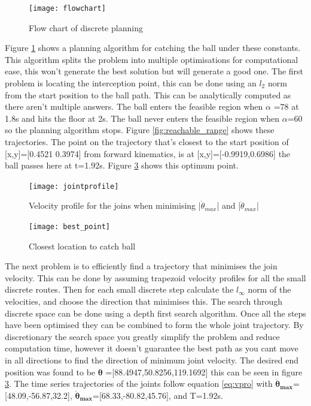 \documentclass[twoside,twocolumn]{article}
\begin{document}
\begin{figure}[h]
  \centering
    \texttt{[image: flowchart]}
  \caption{Flow chart of discrete planning}
  \label{fig:flow}
\end{figure}

Figure \ref{fig:flow} shows a planning algorithm for catching the ball under these constants. This algorithm splits the problem into multiple optimisations for computational ease, this won't generate the best solution but will generate a good one. The first problem is locating the interception point, this can be done using an $l_2$ norm from the start position to the ball path. This can be analytically computed as there aren't multiple answers. The ball enters the feasible region when $\alpha$ =78 at 1.8s and hits the floor at 2s. The ball never enters the feasible region when $\alpha$=60 so the planning algorithm stops. Figure \ref{fig:reachable_range} shows these trajectories. The point on the trajectory that's closest to the start position of [x,y]=[0.4521 0.3974] from forward kinematics, is at [x,y]=[-0.9919,0.6986] the ball passes here at t=1.92s. Figure \ref{fig:bp} shows this optimum point.

\begin{figure}[h]
  \centering
    \texttt{[image: jointprofile]}
  \caption{Velocity profile for the joins when minimising |$\dot{\theta}_{max}$| and |$\ddot{\theta}_{max}$|}
  \label{fig:bp}
\end{figure}
\begin{figure}[h]
  \centering
    \texttt{[image: best\_point]}
  \caption{Closest location to catch ball}
  \label{fig:bp}
\end{figure}

The next problem is to efficiently find a trajectory that minimises the join velocity. This can be done by assuming trapezoid velocity profiles for all the small discrete routes. Then for each small discrete step calculate the $l_{\infty}$ norm of the velocities, and choose the direction that minimises this. The search through discrete space can be done using a depth first search algorithm. Once all the steps have been optimised they can be combined to form the whole joint trajectory.
\newline
By discretionary the search space you greatly simplify the problem and reduce computation time, however it doesn't guarantee the best path as you cant move in all directions to find the direction of minimum joint velocity. 
\newline
The desired end position was found to be $\boldsymbol{\theta}$ =[88.4947,50.8256,119.1692] this can be seen in figure \ref{fig:bp}.
\newline
The time series trajectories of the joints follow equation \ref{eq:vpro} with $\boldsymbol{\dot{\theta}_{max}}$=[48.09,-56.87,32.2], $\boldsymbol{\ddot{\theta}_{max}}$=[68.33,-80.82,45.76], and T=1.92s.
\end{document}
